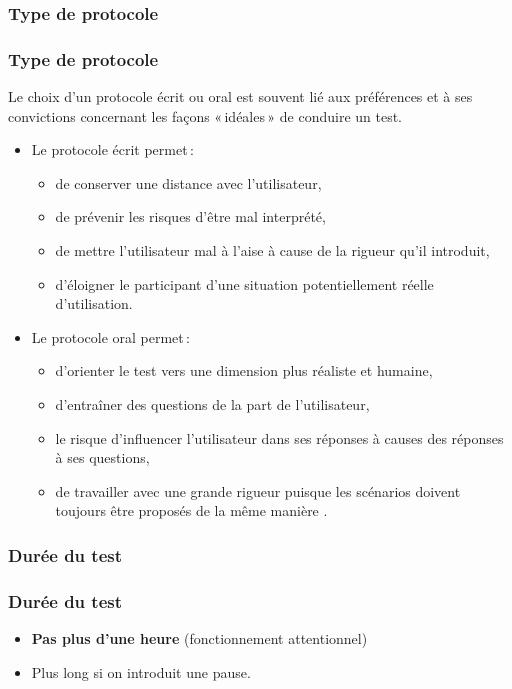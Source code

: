 		
						
				
	
			
			\subsubsection{Type de protocole} 
			\begin{frame}[allowframebreaks]
			\frametitle{Type de protocole  \citep{ergolab2014a}}
				Le choix d'un protocole écrit ou oral est souvent lié aux préférences et à ses convictions concernant les façons «\,idéales\,»  de conduire un test.

				\begin{itemize}
				\item Le protocole écrit permet\,:
					\begin{itemize}
					\item de conserver une distance avec l'utilisateur,
					\item de prévenir les risques d'être mal interprété,
					\item de mettre l'utilisateur mal à l'aise à cause de la rigueur qu'il introduit,
					\item d'éloigner le participant d'une situation potentiellement réelle d'utilisation. 
					\end{itemize} 
				\framebreak
				\item Le protocole oral permet\,:
				\begin{itemize}
					\item d'orienter le test vers une dimension plus réaliste et humaine,
					\item d'entraîner des questions de la part de l'utilisateur,
					\item le risque d'influencer l'utilisateur dans ses réponses à causes des réponses à ses questions,
					\item de travailler avec une grande rigueur puisque les scénarios doivent toujours être proposés de la même manière . 
					\end{itemize} 
				\end{itemize} 
				\end{frame} 
				
				
				
			\subsubsection{Durée du test} 
			\begin{frame}[allowframebreaks]
			\frametitle{Durée du test \citep{ergolab2014a}}
				

				\begin{itemize}
				\item \textbf{Pas plus d'une heure }(fonctionnement attentionnel)
				\item Plus long si on introduit une pause. 	
				\end{itemize} 
				\end{frame} 	
				
